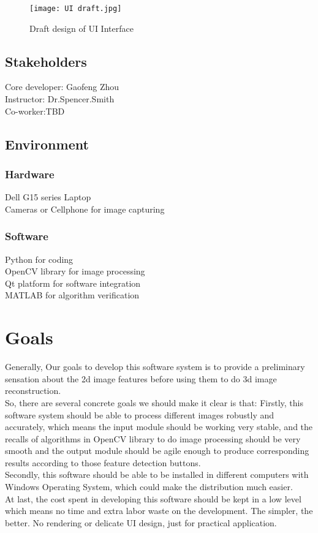 \documentclass{article}
\begin{document}
\begin{figure}[h]
  \centering
  \texttt{[image: UI draft.jpg]}
  \caption{Draft design of UI Interface}
  \label{fig:image1}
\end{figure}



\subsection{Stakeholders}
Core developer: Gaofeng Zhou\\
Instructor: Dr.Spencer.Smith\\
Co-worker:TBD\\


\subsection{Environment}

\subsubsection{Hardware}

Dell G15 series Laptop\\
Cameras or Cellphone for image capturing\\

\subsubsection{Software}

Python for coding\\
OpenCV library for image processing\\
Qt platform for software integration\\
MATLAB for algorithm verification\\

\section{Goals}

Generally, Our goals to develop this software system is to provide a preliminary sensation about the 2d image features before using them to do 3d image reconstruction.\\
So, there are several concrete goals we should make it clear is that:
Firstly, this software system should be able to process different images robustly and accurately, which means the input module should be working very stable, and the recalls of algorithms in OpenCV library to do image processing should be very smooth and the output module should be agile enough to produce corresponding results according to those feature detection buttons.\\
Secondly, this software should be able to be installed in different computers with Windows Operating System, which could make the distribution much easier.\\
At last, the cost spent in developing this software should be kept in a low level which means no time and extra labor waste on the development. The simpler, the better. No rendering or delicate UI design, just for practical application.
\end{document}
